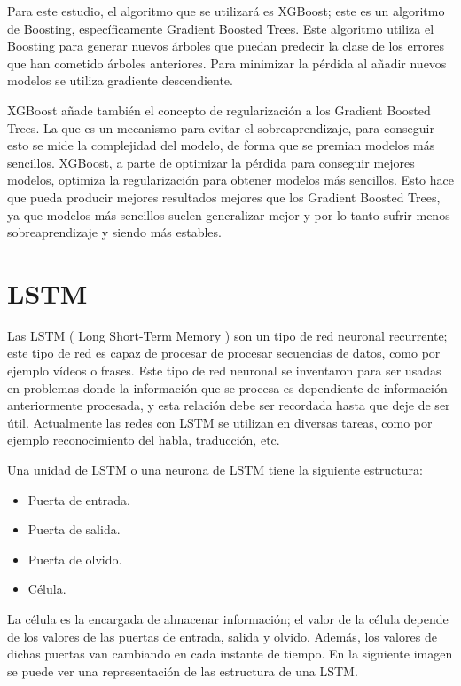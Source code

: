 Para este estudio, el algoritmo que se utilizará es XGBoost; este es un algoritmo de Boosting, específicamente Gradient Boosted Trees. Este algoritmo utiliza el Boosting para generar nuevos árboles que puedan predecir la clase de los errores que han cometido árboles anteriores. Para minimizar la pérdida al añadir nuevos modelos se utiliza gradiente descendiente.\newline

XGBoost añade también el concepto de regularización a los Gradient Boosted Trees. La que es un mecanismo para evitar el sobreaprendizaje, para conseguir esto se mide la complejidad del modelo, de forma que se premian modelos más sencillos. XGBoost, a parte de optimizar la pérdida para conseguir mejores modelos, optimiza la regularización para obtener modelos más sencillos. Esto hace que pueda producir mejores resultados mejores que los Gradient Boosted Trees, ya que modelos más sencillos suelen generalizar mejor y por lo tanto sufrir menos sobreaprendizaje y siendo más estables.

\newpage
\section{LSTM}
Las LSTM ( Long Short-Term Memory ) son un tipo de red neuronal recurrente; este tipo de red es capaz de procesar de procesar secuencias de datos, como por ejemplo vídeos o frases. Este tipo de red neuronal se inventaron para ser usadas en problemas donde la información que se procesa es dependiente de información anteriormente procesada, y esta relación debe ser recordada hasta que deje de ser útil. Actualmente las redes con LSTM se utilizan en diversas tareas, como por ejemplo reconocimiento del habla, traducción, etc.\newline

Una unidad de LSTM o una neurona de LSTM tiene la siguiente estructura:
\begin{itemize}
	\item Puerta de entrada.
	\item Puerta de salida.
	\item Puerta de olvido.
	\item Célula.
\end{itemize}
\vspace{0.09in}
La célula es la encargada de almacenar información; el valor de la célula depende de los valores de las puertas de entrada, salida y olvido. Además, los valores de dichas puertas van cambiando en cada instante de tiempo. En la siguiente imagen se puede ver una representación de las estructura de una LSTM.\newline

